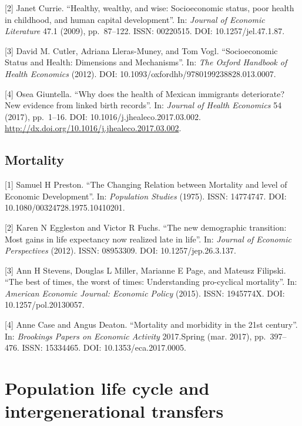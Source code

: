 \documentclass[
  12pt,
]{article}
\begin{document}
{[}2{]} Janet Currie. ``Healthy, wealthy, and wise: Socioeconomic
status, poor health in childhood, and human capital development''. In:
\emph{Journal of Economic Literature} 47.1 (2009), pp.~87--122. ISSN:
00220515. DOI: 10.1257/jel.47.1.87.

{[}3{]} David M. Cutler, Adriana Lleras-Muney, and Tom Vogl.
``Socioeconomic Status and Health: Dimensions and Mechanisms''. In:
\emph{The Oxford Handbook of Health Economics} (2012). DOI:
10.1093/oxfordhb/9780199238828.013.0007.

{[}4{]} Osea Giuntella. ``Why does the health of Mexican immigrants
deteriorate? New evidence from linked birth records''. In:
\emph{Journal of Health Economics} 54 (2017), pp.~1--16. DOI:
10.1016/j.jhealeco.2017.03.002.
\url{http://dx.doi.org/10.1016/j.jhealeco.2017.03.002}.

\hypertarget{mortality}{%
\subsection{Mortality}\label{mortality}}

{[}1{]} Samuel H Preston. ``The Changing Relation between Mortality and
level of Economic Development''. In: \emph{Population Studies} (1975).
ISSN: 14774747. DOI: 10.1080/00324728.1975.10410201.

{[}2{]} Karen N Eggleston and Victor R Fuchs. ``The new demographic
transition: Most gains in life expectancy now realized late in life''.
In: \emph{Journal of Economic Perspectives} (2012). ISSN: 08953309. DOI:
10.1257/jep.26.3.137.

{[}3{]} Ann H Stevens, Douglas L Miller, Marianne E Page, and Mateusz
Filipski. ``The best of times, the worst of times: Understanding
pro-cyclical mortality''. In:
\emph{American Economic Journal: Economic Policy} (2015). ISSN:
1945774X. DOI: 10.1257/pol.20130057.

{[}4{]} Anne Case and Angus Deaton. ``Mortality and morbidity in the
21st century''. In: \emph{Brookings Papers on Economic Activity}
2017.Spring (mar. 2017), pp.~397--476. ISSN: 15334465. DOI:
10.1353/eca.2017.0005.

\hypertarget{population-life-cycle-and-intergenerational-transfers}{%
\section{\texorpdfstring{\textbf{Population life cycle and
intergenerational
transfers}}{Population life cycle and intergenerational transfers}}\label{population-life-cycle-and-intergenerational-transfers}}
\end{document}
